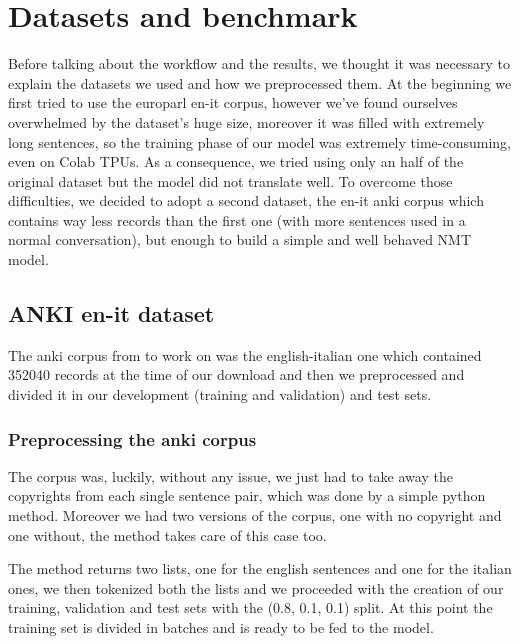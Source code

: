 \section{Datasets and benchmark}\label{sec:dataset}
Before talking about the workflow and the results, we thought it was necessary to explain the datasets we used and how we preprocessed them. At the beginning we first tried to use the  europarl en-it corpus, however we've found ourselves overwhelmed by the dataset's huge size, moreover it was filled with extremely long sentences, so the training phase of our model was extremely time-consuming, even on Colab TPUs. As a consequence, we tried using only an half of the original dataset but the model did not translate well. To overcome those difficulties,  we decided to adopt a second dataset, the en-it anki corpus which contains way less records than the first one (with more sentences used in a normal conversation), but enough to build a simple and well behaved NMT model.
\subsection{ANKI en-it dataset}
The anki corpus from \cite{anki_dataset} to work on was the english-italian one which contained 352040 records at the time of our download and then we preprocessed and divided it in our development (training and validation) and test sets.
\subsubsection{Preprocessing the anki corpus}
The corpus was, luckily, without any issue, we just had to take away the copyrights from each single sentence pair, which was done by a simple python method. Moreover we had two versions of the corpus, one with no copyright and one without, the method takes care of this case too.
\begin{comment}
\begin{verbatim}
def create_dataset_anki(name: str, preprocessed: bool = False):
    with open(name, encoding="UTF-8") as datafile:
        src_set = list()
        dst_set = list()
        for sentence in datafile:
            sentence = sentence.split("\t")
            src_set.append(sentence[0])
            if preprocessed:
                dst_set.append(sentence[1].split("\n")[0])
            else:
                dst_set.append(sentence[1])

    return src_set, dst_set
\end{verbatim}
\end{comment}
The method returns two lists, one for the english sentences and one for the italian ones, we then tokenized both the lists and we proceeded with the creation of our training, validation and test sets with the (0.8, 0.1, 0.1) split.
At this point the training set is divided in batches and is ready to be fed to the model.
